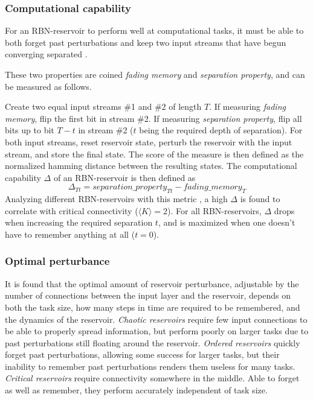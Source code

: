 \subsubsection{Computational capability}
\label{section:computational-capability}
For an RBN-reservoir to perform well at computational tasks,
it must be able to both forget past perturbations and keep two input streams that have begun converging separated \cite{bertschinger2004real}.

These two properties are coined \textit{fading memory} and \textit{separation property},
and can be measured \cite{rbn-reservoir} as follows.

Create two equal input streams \#1 and \#2 of length $T$.
If measuring \textit{fading memory}, flip the first bit in stream \#2.
If measuring \textit{separation property}, flip all bits up to bit $T-t$ in stream \#2
($t$ being the required depth of separation).
For both input streams, reset reservoir state, perturb the reservoir with the input stream,
and store the final state.
The score of the measure is then defined as the normalized hamming distance between the resulting states.
The computational capability $\Delta$ of an RBN-reservoir is then defined as
\begin{equation}
  \Delta_{Tt} = separation\_property_{Tt} - fading\_memory_{T}
\label{formula:accuracy}
\end{equation}
Analyzing different RBN-reservoirs with this metric \cite{rbn-reservoir},
a high $\Delta$ is found to correlate with critical connectivity ($\langle K \rangle = 2$).
For all RBN-reservoirs, $\Delta$ drops when increasing the required separation $t$,
and is maximized when one doesn't have to remember anything at all ($t=0$).

\subsubsection{Optimal perturbance}
\label{section:optimal-perturbance}
It is found that the optimal amount of reservoir perturbance,
adjustable by the number of connections between the input layer and the reservoir,
depends on both the task size, how many steps in time are required to be remembered,
and the dynamics of the reservoir.
\textit{Chaotic reservoirs} require few input connections to be able to properly spread information,
but perform poorly on larger tasks due to past perturbations still floating around the reservoir.
\textit{Ordered reservoirs} quickly forget past perturbations, allowing some success for larger tasks,
but their inability to remember past perturbations renders them useless for many tasks.
\textit{Critical reservoirs} require connectivity somewhere in the middle.
Able to forget as well as remember, they perform accurately independent of task size.

